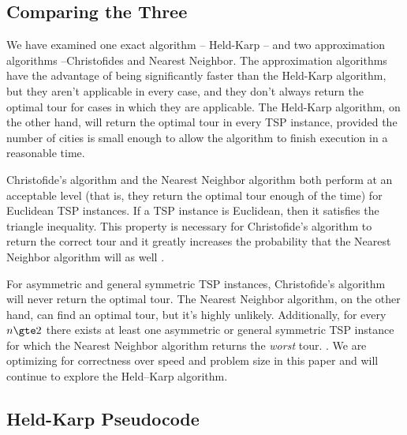 \documentclass[11pt,fleqn]{article}
\begin{document}
\subsection{Comparing the Three}
We have examined one exact algorithm -- Held-Karp -- and two approximation
algorithms --Christofides and Nearest Neighbor.  The approximation algorithms
have the advantage of being significantly faster than the Held-Karp algorithm,
but they aren't applicable in every case, and they don't always return the optimal
tour for cases in which they are applicable.  The Held-Karp algorithm, on the other
hand, will return the optimal tour in every TSP instance, provided the number of
cities is small enough to allow the algorithm to finish execution in a reasonable
time.
\par

Christofide's algorithm and the Nearest Neighbor algorithm both perform at an
acceptable level (that is, they return the optimal tour enough of the time) for
Euclidean TSP instances.  If a TSP instance is Euclidean, then it satisfies the
triangle inequality.  This property is necessary for Christofide's algorithm to
return the correct tour \cite{nicos} and it greatly increases the probability
that the Nearest Neighbor algorithm will as well \cite{gutin}.
\par

For asymmetric and general symmetric TSP instances, Christofide's algorithm will
never return the optimal tour.  The Nearest Neighbor algorithm, on the other hand,
can find an optimal tour, but it's highly unlikely.  Additionally, for every $n\gte 2$
there exists at least one asymmetric or general symmetric TSP instance for which the
Nearest Neighbor algorithm returns the \textit{worst} tour. \cite{gutin}.  We are
optimizing for correctness over speed and problem size in this paper and will continue
to explore the Held--Karp algorithm.

\subsection{Held-Karp Pseudocode}




%
%
%
\newpage


\end{document}
